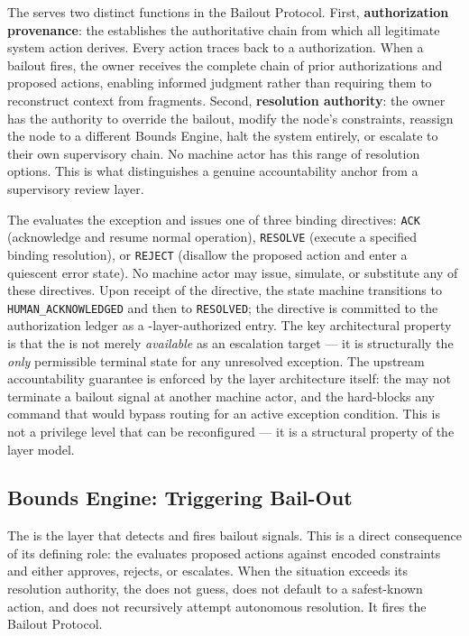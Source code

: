The \purpose{} serves two distinct functions in the Bailout Protocol. First, \textbf{authorization provenance}: the \purpose{} establishes the authoritative chain from which all legitimate system action derives. Every \bounds{} action traces back to a \purpose{} authorization. When a bailout fires, the \purpose{} owner receives the complete chain of prior authorizations and proposed actions, enabling informed judgment rather than requiring them to reconstruct context from fragments. Second, \textbf{resolution authority}: the \purpose{} owner has the authority to override the bailout, modify the node's constraints, reassign the node to a different Bounds Engine, halt the system entirely, or escalate to their own supervisory chain. No machine actor has this range of resolution options. This is what distinguishes a genuine accountability anchor from a supervisory review layer.

The \purpose{} evaluates the exception and issues one of three binding directives: \texttt{ACK} (acknowledge and resume normal operation), \texttt{RESOLVE} (execute a specified binding resolution), or \texttt{REJECT} (disallow the proposed action and enter a quiescent error state). No machine actor may issue, simulate, or substitute any of these directives. Upon receipt of the directive, the state machine transitions to \texttt{HUMAN\_ACKNOWLEDGED} and then to \texttt{RESOLVED}; the directive is committed to the authorization ledger as a \purpose{}-layer-authorized entry. The key architectural property is that the \purpose{} is not merely \textit{available} as an escalation target — it is structurally the \textit{only} permissible terminal state for any unresolved exception. The \bxthree{} upstream accountability guarantee is enforced by the layer architecture itself: the \bounds{} may not terminate a bailout signal at another machine actor, and the \fact{} hard-blocks any command that would bypass \purpose{} routing for an active exception condition. This is not a privilege level that can be reconfigured — it is a structural property of the layer model.

\subsection{Bounds Engine: Triggering Bail-Out}
\label{sec:bounds-trigger}

The \bounds{} is the layer that detects and fires bailout signals. This is a direct consequence of its defining role: the \bounds{} evaluates proposed actions against encoded constraints and either approves, rejects, or escalates. When the situation exceeds its resolution authority, the \bounds{} does not guess, does not default to a safest-known action, and does not recursively attempt autonomous resolution. It fires the Bailout Protocol.

